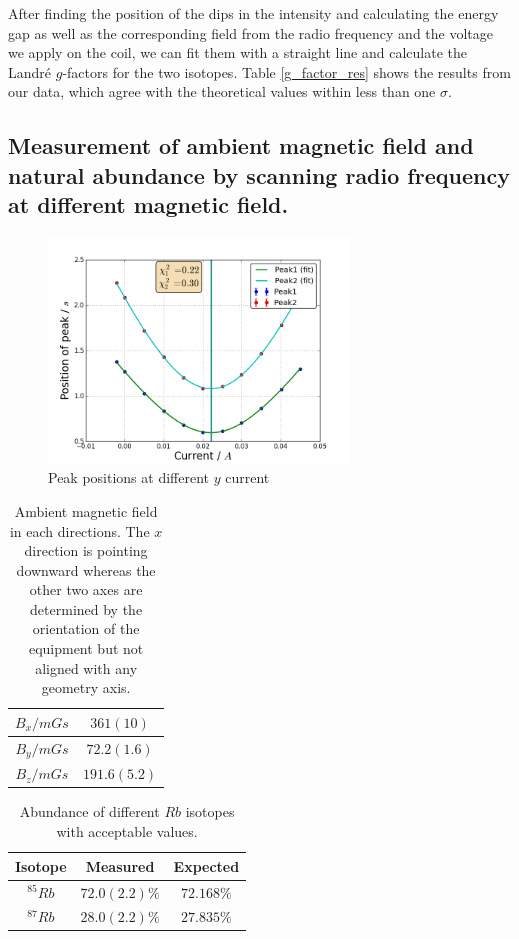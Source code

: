 \documentclass[aps,twocolumn,secnumarabic,balancelastpage,amsmath,amssymb,nofootinbib]{revtex4}
\begin{document}
After finding the position of the dips in the intensity and calculating the energy gap as well as the corresponding field from the radio frequency and the voltage we apply on the coil, we can fit them with a straight line and calculate the Landr\'e $g$-factors for the two isotopes. Table \ref{g_factor_res} shows the results from our data, which agree with the theoretical values within less than one $\sigma$.

\subsection{Measurement of ambient magnetic field and natural abundance by scanning radio frequency at different magnetic field.}
\begin{figure}
  \includegraphics[width=8cm]{../rfscan_nf/rfscan_y_fit.png}
  \caption{Peak positions at different $y$ current}
  \label{rfscan_fit}
\end{figure}
\begin{table}
  \begin{tabular}{|c|c|}
    \hline
    $B_x/mGs$&$361(10)$\\\hline
    $B_y/mGs$&$72.2(1.6)$\\\hline
    $B_z/mGs$&$191.6(5.2)$\\\hline
  \end{tabular}
  \caption{Ambient magnetic field in each directions. The $x$ direction is pointing downward whereas the other two axes are determined by the orientation of the equipment but not aligned with any geometry axis.}
  \label{ambient_field_res}
\end{table}
\begin{table}
  \begin{tabular}{|c|c|c|}
    \hline
    Isotope&Measured&Expected\\\hline
    ${}^{85}Rb$&$72.0(2.2)\%$&$72.168\%$\\\hline
    ${}^{87}Rb$&$28.0(2.2)\%$&$27.835\%$\\\hline
  \end{tabular}
  \caption{Abundance of different $Rb$ isotopes with acceptable values.}
  \label{abundance_res}
\end{table}
\end{document}
